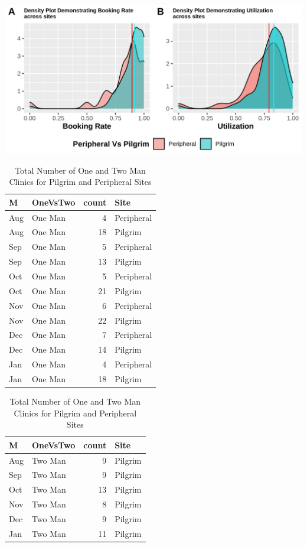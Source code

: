\documentclass[]{article}
\begin{document}
\begin{center}\includegraphics{LF2_files/figure-latex/unnamed-chunk-3-1} \end{center}

\begin{table}
\caption{\label{tab:unnamed-chunk-4}Total Number of One and Two Man Clinics for Pilgrim and Peripheral Sites}

\centering
\begin{tabular}[t]{llrl}
\toprule
M & OneVsTwo & count & Site\\
\midrule
Aug & One Man & 4 & Peripheral\\
Aug & One Man & 18 & Pilgrim\\
Sep & One Man & 5 & Peripheral\\
Sep & One Man & 13 & Pilgrim\\
Oct & One Man & 5 & Peripheral\\
\addlinespace
Oct & One Man & 21 & Pilgrim\\
Nov & One Man & 6 & Peripheral\\
Nov & One Man & 22 & Pilgrim\\
Dec & One Man & 7 & Peripheral\\
Dec & One Man & 14 & Pilgrim\\
\addlinespace
Jan & One Man & 4 & Peripheral\\
Jan & One Man & 18 & Pilgrim\\
\bottomrule
\end{tabular}
\centering
\begin{tabular}[t]{llrl}
\toprule
M & OneVsTwo & count & Site\\
\midrule
Aug & Two Man & 9 & Pilgrim\\
Sep & Two Man & 9 & Pilgrim\\
Oct & Two Man & 13 & Pilgrim\\
Nov & Two Man & 8 & Pilgrim\\
Dec & Two Man & 9 & Pilgrim\\
\addlinespace
Jan & Two Man & 11 & Pilgrim\\
\bottomrule
\end{tabular}
\end{table}
\end{document}

